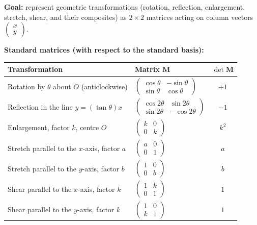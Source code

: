 \documentclass[11pt]{article}
\begin{document}
\begin{methode}
\textbf{Goal:} represent geometric transformations (rotation, reflection, enlargement, stretch, shear, and their composites) as $2\times 2$ matrices acting on column vectors $\begin{pmatrix} x \\ y \end{pmatrix}$.

\textbf{Standard matrices (with respect to the standard basis):}
\begin{center}
\begin{tabularx}{\linewidth}{|l|X|c|}\hline
\rowcolor{popblueL}
\textbf{Transformation} & \textbf{Matrix $\mathbf{M}$} & \textbf{$\det\mathbf{M}$} \\ \hline
Rotation by $\theta$ about $O$ (anticlockwise) & $\begin{pmatrix} \cos\theta & -\sin\theta \\ \sin\theta & \cos\theta \end{pmatrix}$ & $+1$ \\ \hline
Reflection in the line $y = (\tan\theta)x$ & $\begin{pmatrix} \cos 2\theta & \sin 2\theta \\ \sin 2\theta & -\cos 2\theta \end{pmatrix}$ & $-1$ \\ \hline
Enlargement, factor $k$, centre $O$ & $\begin{pmatrix} k & 0 \\ 0 & k \end{pmatrix}$ & $k^2$ \\ \hline
Stretch parallel to the $x$-axis, factor $a$ & $\begin{pmatrix} a & 0 \\ 0 & 1 \end{pmatrix}$ & $a$ \\ \hline
Stretch parallel to the $y$-axis, factor $b$ & $\begin{pmatrix} 1 & 0 \\ 0 & b \end{pmatrix}$ & $b$ \\ \hline
Shear parallel to the $x$-axis, factor $k$ & $\begin{pmatrix} 1 & k \\ 0 & 1 \end{pmatrix}$ & $1$ \\ \hline
Shear parallel to the $y$-axis, factor $k$ & $\begin{pmatrix} 1 & 0 \\ k & 1 \end{pmatrix}$ & $1$ \\ \hline

\end{tabularx}
\end{center}
\end{methode}
\end{document}
